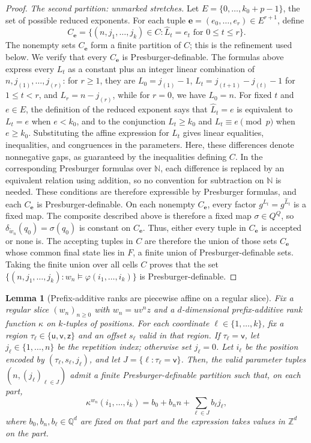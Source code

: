 \documentclass[11pt]{article}
\newtheorem{lemma}[theorem]{Lemma}
\theoremstyle{definition}
\newcommand{\N}{\mathbb N}
\newcommand{\Z}{\mathbb Z}
\begin{document}
\begin{proof}
\vspace{0.5em}
\noindent\emph{The second partition: unmarked stretches.}
Let $E=\{0,\ldots,k_0+p-1\}$, the set of possible reduced exponents.  For each
tuple $\mathbf e=(e_0,\ldots,e_r)\in E^{r+1}$, define
\[
   C_{\mathbf e}
   =\{(n,j_1,\ldots,j_k)\in C:
       \widehat L_t=e_t\text{ for }0\le t\le r\}.
\]
The nonempty sets $C_{\mathbf e}$ form a finite partition of $C$; this is the
refinement used below.  We verify that every $C_{\mathbf e}$ is
Presburger-definable.  The formulas above express every $L_t$
as a constant plus an integer linear combination of
$n,j_{(1)},\ldots,j_{(r)}$: for $r\ge1$, they are
$L_0=j_{(1)}-1$, $L_t=j_{(t+1)}-j_{(t)}-1$ for $1\le t<r$, and
$L_r=n-j_{(r)}$, while for $r=0$, we have $L_0=n$.  For fixed $t$ and
$e\in E$, the definition of the reduced exponent says that
$\widehat L_t=e$ is equivalent to $L_t=e$ when $e<k_0$, and to the conjunction
$L_t\ge k_0$ and $L_t\equiv e\pmod p$ when $e\ge k_0$.
Substituting the affine expression for $L_t$ gives linear equalities,
inequalities, and congruences in the parameters.  Here, these differences
denote nonnegative gaps, as guaranteed by the inequalities defining
$C$.  In the corresponding Presburger formulas over $\N$, each difference is
replaced by an equivalent relation using addition, so no convention for
subtraction on $\N$ is needed.  These conditions are therefore expressible by
Presburger formulas, and each
$C_{\mathbf e}$ is Presburger-definable.  On each nonempty $C_{\mathbf e}$,
every factor
$g^{L_t}=g^{\widehat L_t}$ is a fixed map.  The composite
described above is therefore a fixed map $\sigma\in Q^Q$, so
$\delta_{\widetilde w_n}(q_0)=\sigma(q_0)$ is constant on $C_{\mathbf e}$.
Thus, either every tuple in $C_{\mathbf e}$ is accepted or none is.  The
accepting tuples in $C$ are therefore the union of those sets $C_{\mathbf e}$
whose common final state lies in $F$, a finite union of Presburger-definable
sets.  Taking the finite union over all cells $C$ proves that the set
$\{(n,j_1,\ldots,j_k):w_n\models\varphi(i_1,\ldots,i_k)\}$ is
Presburger-definable.
\end{proof}

\begin{lemma}[Prefix-additive ranks are piecewise affine on a regular slice]
\label{lem:one-loop-rank-affine}
Fix a regular slice $(w_n)_{n\ge0}$ with $w_n=uv^nz$ and a $d$-dimensional prefix-additive rank
function $\kappa$ on $k$-tuples of positions.  For each coordinate
$\ell\in\{1,\ldots,k\}$, fix a region
$\tau_\ell\in\{\mathsf u,\mathsf v,\mathsf z\}$ and an offset $s_\ell$ valid in
that region.  If $\tau_\ell=\mathsf v$, let
$j_\ell\in\{1,\ldots,n\}$ be the repetition index; otherwise set $j_\ell=0$.
Let $i_\ell$ be the position encoded by $(\tau_\ell,s_\ell,j_\ell)$, and let
$J=\{\ell:\tau_\ell=\mathsf v\}$.  Then, the valid parameter tuples
$(n,(j_\ell)_{\ell\in J})$ admit a finite Presburger-definable partition such
that, on each part,
\[
   \kappa^{w_n}(i_1,\ldots,i_k)
   =b_0+b_n n+\sum_{\ell\in J} b_\ell j_\ell,
\]
where $b_0,b_n,b_\ell\in\mathbb Q^d$ are fixed on that part and the expression
takes values in $\Z^d$ on the part.
\end{lemma}
\end{document}
